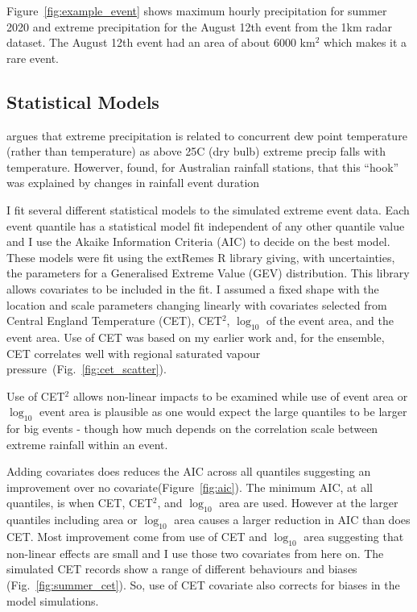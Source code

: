 \documentclass[11pt,a4paper]{article}
\begin{document}
Figure~\ref{fig:example_event} shows maximum hourly precipitation for summer 2020 and  extreme precipitation for the August 12th event from the 1km radar dataset. The August 12th event had an area of about 6000 km$^2$ which makes it a rare event. 


\subsection{Statistical Models}

\cite{fowler2021rainfall_extremes} argues that extreme precipitation is related to concurrent dew point temperature (rather than temperature) as above 25C (dry bulb) extreme precip falls with temperature.  Howerver, \cite{Visser2021hook_precipitation} found, for Australian rainfall stations, that this ``hook'' was explained by changes in rainfall event duration

I fit several different statistical models to the simulated  extreme event data. Each event quantile has a  statistical model fit independent of any other quantile value and I use the Akaike Information Criteria (AIC) to decide on the best model\parencite{akaike74aic}. These models were fit using the extRemes R library\parencite{gilleland2016extremes} giving, with uncertainties, the parameters for a Generalised Extreme Value (GEV) distribution.   This library allows covariates to be included in the fit. I assumed a fixed shape with the location and scale parameters changing linearly with covariates selected from  Central England Temperature (CET), CET$^2$,  $\log_{10}$ of the event area, and the event area.  Use of CET was based on my earlier work\parencite{tett2023edinburgh} and, for the ensemble, CET correlates well with regional saturated vapour pressure~(Fig.~\ref{fig:cet_scatter}). 

 
 Use of CET$^2$ allows non-linear impacts to be examined while use of  event area or $\log_{10}$ event area is plausible as one would expect the large quantiles to be larger for big events - though how much depends on the correlation scale between extreme rainfall within an event. 

Adding covariates does reduces the AIC across all quantiles suggesting an improvement over no covariate(Figure~\ref{fig:aic}). The minimum AIC, at all quantiles, is when CET, CET$^2$,  and $\log_{10}$ area are used. However at the larger quantiles including area or $\log_{10}$ area causes a larger reduction in AIC than does CET.  Most improvement come from use of CET and $\log_{10}$ area suggesting that non-linear effects are small and I use those two covariates from here on. 
The simulated CET records show a range of different behaviours and biases (Fig.~\ref{fig:summer_cet}). So, use of CET covariate also corrects for biases in the model simulations. 
\end{document}
